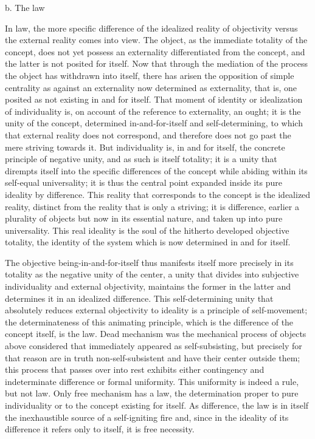 b. The law

In law, the more specific difference of the idealized reality of objectivity
versus the external reality comes into view. The object, as the immediate
totality of the concept, does not yet possess an externality differentiated
from the concept, and the latter is not posited for itself. Now that through
the mediation of the process the object has withdrawn into itself, there
has arisen the opposition of simple centrality as against an externality now
determined as externality, that is, one posited as not existing in and for itself.
That moment of identity or idealization of individuality is, on account
of the reference to externality, an ought; it is the unity of the concept,
determined in-and-for-itself and self-determining, to which that external
reality does not correspond, and therefore does not go past the mere striving
towards it. But individuality is, in and for itself, the concrete principle of
negative unity, and as such is itself totality; it is a unity that dirempts itself
into the specific differences of the concept while abiding within its self-equal universality;
it is thus the central point expanded inside its pure ideality by difference.
This reality that corresponds to the concept is the idealized
reality, distinct from the reality that is only a striving; it is difference, earlier
a plurality of objects but now in its essential nature, and taken up into pure
universality. This real ideality is the soul of the hitherto developed objective
totality, the identity of the system which is now determined in and for itself.

The objective being-in-and-for-itself thus manifests itself more precisely
in its totality as the negative unity of the center, a unity that divides into
subjective individuality and external objectivity, maintains the former in the
latter and determines it in an idealized difference. This self-determining
unity that absolutely reduces external objectivity to ideality is a principle
of self-movement; the determinateness of this animating principle, which
is the difference of the concept itself, is the law.
Dead mechanism was the mechanical process of objects
above considered that immediately appeared as self-subsisting,
but precisely for that reason are in truth non-self-subsistent
and have their center outside them;
this process that passes over into rest exhibits
either contingency and indeterminate difference or formal uniformity.
This uniformity is indeed a rule, but not law.
Only free mechanism has a law,
the determination proper to pure individuality
or to the concept existing for itself.
As difference, the law is in itself
the inexhaustible source  of a self-igniting fire
and, since in the ideality of its difference
it refers only to itself,
it is free necessity.

